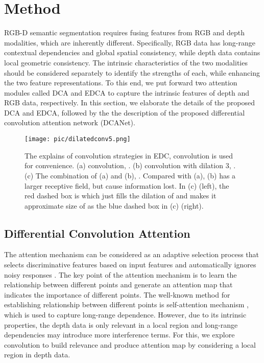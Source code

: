 \documentclass[10pt,twocolumn,letterpaper]{article}
\begin{document}
\section{Method}
RGB-D semantic segmentation requires fusing features from RGB and depth modalities, which are inherently different.
Specifically, RGB data has long-range contextual dependencies and global spatial consistency, while depth data contains local geometric
consistency. The intrinsic characteristics of the two modalities should be considered separately to identify the strengths of each, while
enhancing the two feature representations. To this end, we put forward two attention modules called DCA and EDCA to capture the intrinsic
features of depth and RGB data, respectively. In this section, we elaborate the details of the proposed DCA and EDCA, followed
by the the description of the proposed differential convolution attention network (DCANet).



\begin{figure}[t]
   \centering
   \texttt{[image: pic/dilatedconv5.png]}
   \caption{The explains of convolution strategies in EDC,  convolution is used for convenience.
      (a)  convolution, .
      (b)  convolution with dilation 3, . (c) The combination of (a) and (b),
      . Compared with (a),
      (b) has a larger receptive field, but cause information lost. In (c) (left), the red dashed
      box is  which just fills the dilation of  and makes
      it approximate size of  as the blue dashed box in (c) (right). 
   }
   \label{dilatedconv}
\end{figure}

\subsection{Differential Convolution Attention}
\label{sec-DCA}
The attention mechanism can be considered as an adaptive selection process that selects discriminative features based on input features and
automatically ignores noisy responses \cite{guo2022visual}. The key point of the attention mechanism is to learn the relationship between
different points and generate an attention map that indicates the importance of different points. The well-known method for establishing
relationship between different points is self-attention mechanism \cite{wang2018non,xie2021segformer,fu2019dual,zhao2020exploring}, which
is used to capture long-range dependence. However, due to its intrinsic properties, the depth data is only relevant in a local region and
long-range dependencies may introduce more interference terms. For this, we explore convolution to build relevance and produce
attention map by considering a local region in depth data.
\end{document}
